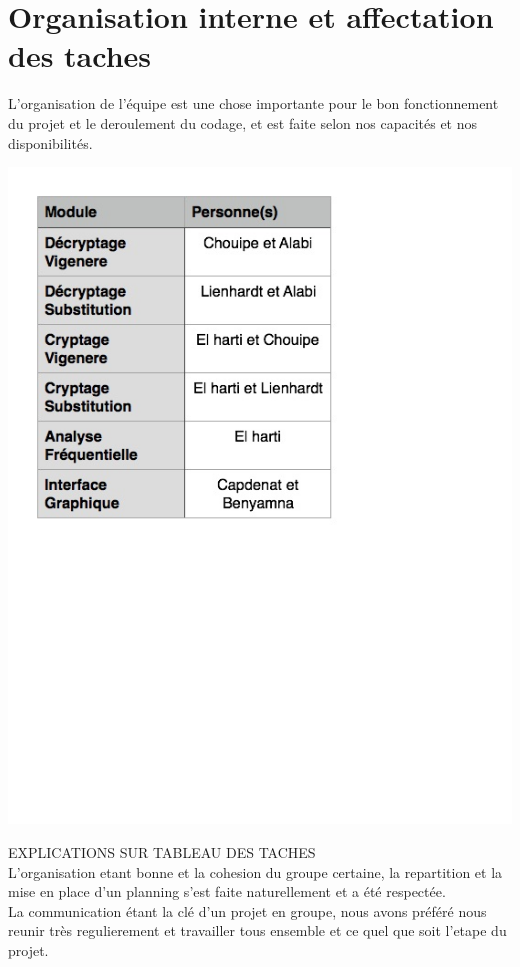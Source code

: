 \documentclass[a4]{article}
\begin{document}
	\section{Organisation interne et affectation des taches}
	L'organisation de l'équipe est une chose importante pour le bon fonctionnement du
projet et le deroulement du codage, et est faite selon nos capacités et nos disponibilités.  \\ 
		 \begin{center}\includegraphics[scale=0.5]{tableau_tache_final.jpg}\end{center}
		 EXPLICATIONS SUR TABLEAU DES TACHES \\ 
		
		L'organisation etant bonne et la cohesion du groupe certaine, la repartition et la mise en place d'un planning 
		s'est faite naturellement et a été respectée.  \\
		La communication étant la clé d'un projet en groupe, nous avons préféré
		 nous reunir très regulierement et travailler tous ensemble et ce quel que soit l'etape du projet.
\end{document}
